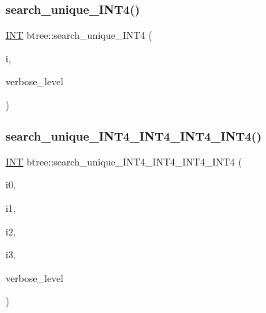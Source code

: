 \mbox{\label{classbtree_addbd561c995e88b0f944cc39e4bf7215}} 
\subsubsection{\texorpdfstring{search\+\_\+unique\+\_\+\+I\+N\+T4()}{search\_unique\_INT4()}}
{\footnotesize\ttfamily \mbox{\hyperlink{galois_8h_a09fddde158a3a20bd2dcadb609de11dc}{I\+NT}} btree\+::search\+\_\+unique\+\_\+\+I\+N\+T4 (\begin{DoxyParamCaption}\item[{\mbox{\hyperlink{galois_8h_a09fddde158a3a20bd2dcadb609de11dc}{I\+NT}}}]{i,  }\item[{\mbox{\hyperlink{galois_8h_a09fddde158a3a20bd2dcadb609de11dc}{I\+NT}}}]{verbose\+\_\+level }\end{DoxyParamCaption})}

\mbox{\label{classbtree_a84ca9f7c7d10a5fbf123bf68081519e1}} 
\subsubsection{\texorpdfstring{search\+\_\+unique\+\_\+\+I\+N\+T4\+\_\+\+I\+N\+T4\+\_\+\+I\+N\+T4\+\_\+\+I\+N\+T4()}{search\_unique\_INT4\_INT4\_INT4\_INT4()}}
{\footnotesize\ttfamily \mbox{\hyperlink{galois_8h_a09fddde158a3a20bd2dcadb609de11dc}{I\+NT}} btree\+::search\+\_\+unique\+\_\+\+I\+N\+T4\+\_\+\+I\+N\+T4\+\_\+\+I\+N\+T4\+\_\+\+I\+N\+T4 (\begin{DoxyParamCaption}\item[{\mbox{\hyperlink{galois_8h_a09fddde158a3a20bd2dcadb609de11dc}{I\+NT}}}]{i0,  }\item[{\mbox{\hyperlink{galois_8h_a09fddde158a3a20bd2dcadb609de11dc}{I\+NT}}}]{i1,  }\item[{\mbox{\hyperlink{galois_8h_a09fddde158a3a20bd2dcadb609de11dc}{I\+NT}}}]{i2,  }\item[{\mbox{\hyperlink{galois_8h_a09fddde158a3a20bd2dcadb609de11dc}{I\+NT}}}]{i3,  }\item[{\mbox{\hyperlink{galois_8h_a09fddde158a3a20bd2dcadb609de11dc}{I\+NT}}}]{verbose\+\_\+level }\end{DoxyParamCaption})}

